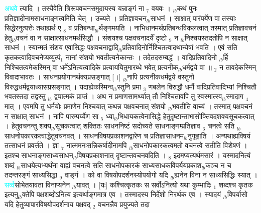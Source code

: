 \documentclass[article,12pt,a4paper]{memoir}%
\newcommand{\quotelemma}[1]{\textcolor{cyan}{#1}}
\begin{document}
	  
	  \pstart \leavevmode%
	\hphantom{.}\quotelemma{अथवे} \cite[6b1]{vn-msN} त्यादि । तस्यैवेति त्रिरूपवचनसमुदायस्य यन्नाङ्गं ना {\tiny $_{7}$} वयवः । {\tiny $_{lb}$}कथं पुनः प्रतिज्ञादीनामसाधनाङ्गत्वमिति चेत् । उच्यते । प्रतिज्ञावचन{\tiny $_{lb}$}साधनं । साक्षात् पारंपर्येण वा तस्याः सिद्धेरनुत्पत्तेः तथाह्यर्थ ए {\tiny $_{8}$} व प्रतिबन्धा{\tiny $_{lb}$}र्थङ्गमयति । नाभिधानमर्थप्रतिबन्धविकलत्वात् तस्मात् प्रतिज्ञावचनं हेतु{\tiny $_{lb}$}वचनं वा न साक्षात्साधनमर्थसिद्धौ । संशयश्च पक्षवचनादर्यें दृष्टो {\tiny $_{9}$} \leavevmode{} न {\tiny $_{lb}$}निश्चयस्तदतोपि न साक्षात् साधनं । स्यान्मतं संशय एवासिद्धः पक्षवचनाद्वादि{\tiny $_{lb}$}प्रतिवादिनोर्निश्चितत्वादथान्येषां भवति । एवं सति कृतकत्वादिवचनेप्यव्युत्पं{\tiny $_{1}$} नानां संशयो भवतीत्यनेकान्तः । तदेतदसम्बद्धं । वादिप्रतिवादिनो {\tiny $_{lb}$}र्हि निश्चितत्वमेकस्मिन् वा धर्मेऽनित्यत्वादिके प्रत्याययितुमारब्धे भवेत् प्रत्यनीक{\tiny $_{lb}$}धर्मद्वये वा ॥ {\tiny $_{2}$} न तावदेकस्मिन् विवादाभावतः । साधनप्रयोगानर्थक्यप्रसङ्गात् [।] {\tiny $_{lb}$}नापि प्रत्यनीकधर्मद्वये वस्तुनो विरुद्धधर्मद्वयाध्यासप्रसङ्गात् । यदाह्येकस्मिन्व{\tiny $_{lb}$}स्तुनि प्रमा {\tiny $_{3}$} णबलेन विरुद्धौ धर्मौ वादिप्रतिवादिभ्यां निश्चितौ भवतस्तदा तद्वस्तु {\tiny $_{lb}$} \leavevmode{} द्व्यात्मकं प्राप्तं । अथ न प्रमाणसामर्थ्यात् तौ निश्चितावपि तु स्वस्मात्स्व{\tiny $_{lb}$}स्मादाग {\tiny $_{4}$} मात् । एवमपि तु धर्मयोः प्रमाणेन निश्चयात् कथन्न पक्षवचनात् संशयो {\tiny $_{lb}$}भवतीति वाच्यं । तस्मात् पक्षवचनं न साक्षात् साधनं । नापि पारम्पर्य्येण सा {\tiny $_{5}$} ध्या{\tiny $_{lb}$}भिधायकत्वेनासिद्धे हेतुदृष्टान्ताभासोक्तिवदशक्यसूचकत्वात् । हेतुवचनन्तु शक्य{\tiny $_{lb}$}सूचकत्वात् शक्तितः साधननिष्टं सदोच्यते साधनाङ्गम्प्रतिज्ञाव {\tiny $_{6}$} चनत्वे सति {\tiny $_{lb}$}साधनोपकारकत्वाद्धेतुवचनवत् । साधनविषयप्रकाशनद्वारेण च प्रतिज्ञासाधनम{\tiny $_{lb}$}नुगृह्णाति । अन्यथाह्यविषयं तत्साधनं प्रवर्त्तते । ज्ञा {\tiny $_{7}$} नात्ममनःसन्निकर्षादीनामपि {\tiny $_{lb}$}साधनोपकारकत्वमतो वचनत्वे सतीति विशेषणं । इतश्च साधनाङ्गसाध्यसाधन{\tiny $_{lb}$}विषयप्रकाशनात् दृष्टान्तवचनवदिति । {\tiny $_{8}$} इदमप्यत्यर्थमसारं । यस्मादनित्यं शब्दं {\tiny $_{lb}$}साधयेत्यभ्यर्थंना वाह्यं वचनत्वे सति साधनोपकारकं साध्यसाधकविपर्ययप्रकाश{\tiny $_{lb}$}कञ्च न च तदन्तरङ्गं साध्यसिद्धा {\tiny $_{9}$} \leavevmode{} वाङ्गं । को वा विषयोपदर्शनस्योपयोगो यदि {\tiny $_{lb}$}ह्यनेन विना न साध्यसिद्धिः स्यात् । \quotelemma{सर्व्व}सोभेतयावता विनाप्यनेन {\tiny $_{lb}$}यावत् । [यः] कश्चित्कृतकः स सर्वोऽनित्यो यथा कुम्भादिः {\tiny $_{1}$} शब्दश्च कृतक इत्यनु{\tiny $_{lb}$}क्तेपि पक्षशब्दोऽनित्य इत्यर्थाङ्गमात्र एव । तस्मादस्य निर्देशो निरर्थक एव । स्यादयं {\tiny $_{lb}$}विपर्यासो यदि हेतुव्यापारविषयोपदर्शनाय पक्षवद् {\tiny $_{2}$} वचनन्नैव प्रयुज्यते तदा 
\end{document}
